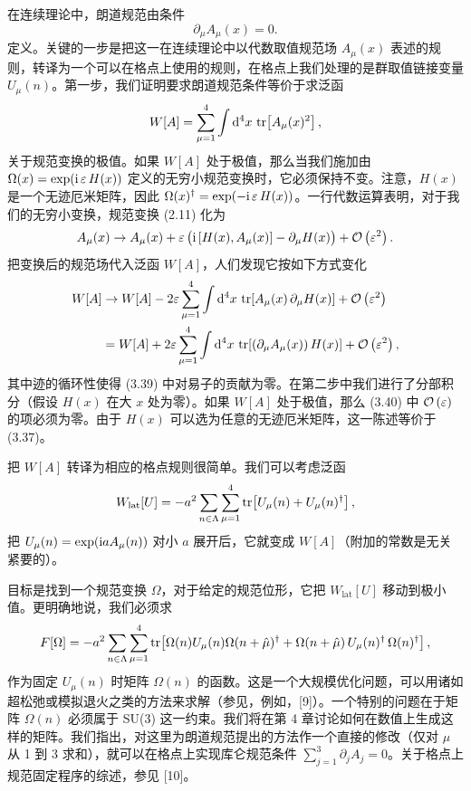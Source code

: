 在连续理论中，朗道规范由条件
\begin{equation}
  \partial_\mu A_\mu(x) = 0 .
\end{equation}
定义。关键的一步是把这一在连续理论中以代数取值规范场 $A_\mu(x)$ 表述的规则，转译为一个可以在格点上使用的规则，在格点上我们处理的是群取值链接变量 $U_\mu(n)$。第一步，我们证明要求朗道规范条件等价于求泛函
\begin{equation}
  W[A] = \sum_{\mu=1}^{4}\int \mathrm{d}^4 x\, \operatorname{tr}\!\left[A_\mu(x)^2\right] ,
\end{equation}
关于规范变换的极值。如果 $W[A]$ 处于极值，那么当我们施加由 $\Omega(x) = \exp(\mathrm{i}\,\varepsilon\, H(x))$ 定义的无穷小规范变换时，它必须保持不变。注意，$H(x)$ 是一个无迹厄米矩阵，因此 $\Omega(x)^\dagger = \exp(-\mathrm{i}\,\varepsilon\, H(x))$。一行代数运算表明，对于我们的无穷小变换，规范变换 (2.11) 化为
\begin{equation}
  A_\mu(x) \to A_\mu(x) + \varepsilon\,\big(\mathrm{i}\,[H(x), A_\mu(x)] - \partial_\mu H(x)\big) + \mathcal{O}\left(\varepsilon^2\right) .
\end{equation}
把变换后的规范场代入泛函 $W[A]$，人们发现它按如下方式变化
\begin{equation}
\begin{split}
  W[A] &\to W[A] - 2\varepsilon\sum_{\mu=1}^{4}\int \mathrm{d}^4 x\,
    \operatorname{tr}\!\left[A_\mu(x)\,\partial_\mu H(x)\right] + \mathcal{O}\left(\varepsilon^2\right) \\
  &= W[A] + 2\varepsilon\sum_{\mu=1}^{4}\int \mathrm{d}^4 x\,
    \operatorname{tr}\!\left[(\partial_\mu A_\mu(x))\, H(x)\right] + \mathcal{O}\left(\varepsilon^2\right) ,
\end{split}
\end{equation}
其中迹的循环性使得 (3.39) 中对易子的贡献为零。在第二步中我们进行了分部积分（假设 $H(x)$ 在大 $x$ 处为零）。如果 $W[A]$ 处于极值，那么 (3.40) 中 $\mathcal{O}\left(\varepsilon\right)$ 的项必须为零。由于 $H(x)$ 可以选为任意的无迹厄米矩阵，这一陈述等价于 (3.37)。

把 $W[A]$ 转译为相应的格点规则很简单。我们可以考虑泛函
\begin{equation}
  W_{\mathrm{lat}}[U] = -a^2\sum_{n\in\Lambda}\sum_{\mu=1}^{4}
    \operatorname{tr}\!\left[U_\mu(n) + U_\mu(n)^\dagger\right] ,
\end{equation}
把 $U_\mu(n) = \exp(\mathrm{i} a A_\mu(n))$ 对小 $a$ 展开后，它就变成 $W[A]$（附加的常数是无关紧要的）。

目标是找到一个规范变换 $\Omega$，对于给定的规范位形，它把 $W_{\mathrm{lat}}[U]$ 移动到极小值。更明确地说，我们必须求
\begin{equation}
  F[\Omega] = -a^2\sum_{n\in\Lambda}\sum_{\mu=1}^{4}
    \operatorname{tr}\!\left[\Omega(n)U_\mu(n)\Omega(n+\hat\mu)^\dagger
    + \Omega(n+\hat\mu)\,U_\mu(n)^\dagger\,\Omega(n)^\dagger\right] ,
\end{equation}
作为固定 $U_\mu(n)$ 时矩阵 $\Omega(n)$ 的函数。这是一个大规模优化问题，可以用诸如超松弛或模拟退火之类的方法来求解（参见，例如，[9]）。一个特别的问题在于矩阵 $\Omega(n)$ 必须属于 SU(3) 这一约束。我们将在第 4 章讨论如何在数值上生成这样的矩阵。我们指出，对这里为朗道规范提出的方法作一个直接的修改（仅对 $\mu$ 从 1 到 3 求和），就可以在格点上实现库仑规范条件 $\sum_{j=1}^{3}\partial_j A_j = 0$。关于格点上规范固定程序的综述，参见 [10]。

